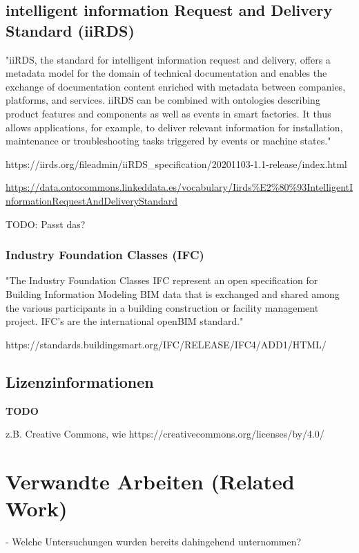 \documentclass{article}
\begin{document}
\subsection{intelligent information Request and Delivery Standard (iiRDS)}

"iiRDS, the standard for intelligent information request and delivery, offers a metadata model for the domain of technical documentation and enables the exchange of documentation content enriched with metadata between companies, platforms, and services. iiRDS can be combined with ontologies describing product features and components as well as events in smart factories. It thus allows applications, for example, to deliver relevant information for installation, maintenance or troubleshooting tasks triggered by events or machine states."

https://iirds.org/fileadmin/iiRDS\_specification/20201103-1.1-release/index.html

\url{https://data.ontocommons.linkeddata.es/vocabulary/Iirds%E2%80%93IntelligentInformationRequestAndDeliveryStandard}

TODO: Passt das?

\subsubsection{Industry Foundation Classes (IFC)}

"The Industry Foundation Classes IFC represent an open specification for Building Information Modeling BIM data that is exchanged and shared among the various participants in a building construction or facility management project. IFC's are the international openBIM standard."

https://standards.buildingsmart.org/IFC/RELEASE/IFC4/ADD1/HTML/

\subsection{Lizenzinformationen}

\textbf{TODO}

z.B. Creative Commons, wie https://creativecommons.org/licenses/by/4.0/


\section{Verwandte Arbeiten (Related Work)}

- Welche Untersuchungen wurden bereits dahingehend unternommen?
\end{document}
